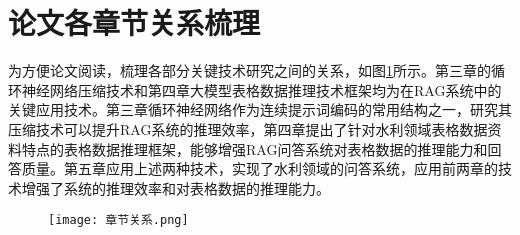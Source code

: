 \section{论文各章节关系梳理}

为方便论文阅读，梳理各部分关键技术研究之间的关系，如图\ref{fig:章节架构}所示。第三章的循环神经网络压缩技术和第四章大模型表格数据推理技术框架均为在RAG系统中的关键应用技术。第三章循环神经网络作为连续提示词编码的常用结构之一，研究其压缩技术可以提升RAG系统的推理效率，第四章提出了针对水利领域表格数据资料特点的表格数据推理框架，能够增强RAG问答系统对表格数据的推理能力和回答质量。第五章应用上述两种技术，实现了水利领域的问答系统，应用前两章的技术增强了系统的推理效率和对表格数据的推理能力。
\begin{figure}[h]
  \centering
  \texttt{[image: 章节关系.png]}
  \label{fig:章节架构}
\end{figure}
\label{sec:first}












